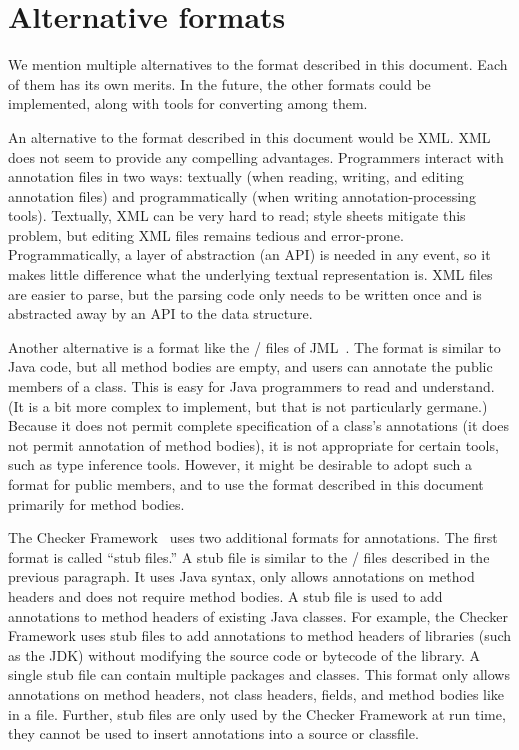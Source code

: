 \documentclass{article}
\newcommand{\code}[1]{\ifmmode{\mbox{\relax\ttfamily{#1}}}\else{\relax\ttfamily #1}\fi}
\begin{document}
\section{Alternative formats\label{alternative-formats}}

We mention multiple alternatives to the format described in this document.
Each of them has its own merits.
In the future, the other formats could be implemented, along with tools for
converting among them.



An alternative to the format described in this document would be XML\@.
XML does not seem to provide any compelling advantages.  Programmers
interact with annotation files in two ways:  textually (when reading, writing,
and editing annotation files) and programmatically (when writing
annotation-processing tools).  Textually, XML can be
very hard to read; style sheets mitigate this
problem, but editing XML files remains tedious and error-prone.
Programmatically, a layer of abstraction (an API) is needed in any event, so it
makes little difference what the underlying textual representation is.
XML files are easier to parse, but the parsing code only needs to be
written once and is abstracted away by an API to the data structure.


Another alternative is a format like the \code{.spec}/\code{.jml} files
of JML~\cite{LeavensBR2006:JML}.  The format is similar to Java code, but
all method bodies are empty, and users can annotate the public members of a
class.  This is easy for Java programmers to read and understand.  (It is a
bit more complex to implement, but that is not particularly germane.)
Because it does not permit complete specification of a class's annotations
(it does not permit annotation of method bodies), it is not appropriate for
certain tools, such as type inference tools.  However, it might be desirable
to adopt such a format for public members, and to use the format
described in this document primarily for method bodies.


The Checker Framework~\cite{DietlDEMS2011,CF} uses two additional formats for
annotations. The first format is called ``stub files.'' A stub file is similar
to the \code{.spec}/\code{.jml} files described in the previous paragraph. It
uses Java syntax, only allows annotations on method headers and does not require
method bodies. A stub file is used to add annotations to method headers of
existing Java classes. For example, the Checker Framework uses stub files to add
annotations to method headers of libraries (such as the JDK) without modifying
the source code or bytecode of the library. A single stub file can contain
multiple packages and classes. This format only allows annotations on method
headers, not class headers, fields, and method bodies like in a \code{.jaif}
file. Further, stub files are only used by the Checker Framework at run time,
they cannot be used to insert annotations into a source or classfile.
\end{document}
